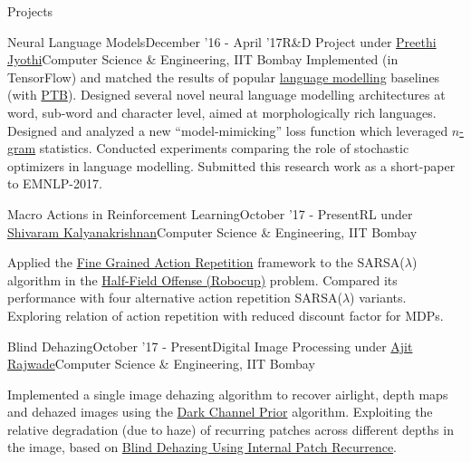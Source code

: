 \documentclass{resume} %
\begin{document}
\begin{rSection}{Projects}
\begin{rSubsection}{Neural Language Models}{December '16 - April '17}{R\&D Project under \href{https://www.cse.iitb.ac.in/~pjyothi/}{Preethi Jyothi}}{Computer Science \& Engineering, IIT Bombay}
Implemented (in TensorFlow) and matched the results of popular \href{https://en.wikipedia.org/wiki/Language_model}{language modelling} baselines (with \href{https://en.wikipedia.org/wiki/Treebank}{PTB}). Designed several novel neural language modelling architectures at word, sub-word and character level, aimed at morphologically rich languages. Designed and analyzed a new ``model-mimicking'' loss function which leveraged \href{https://en.wikipedia.org/wiki/N-gram}{$n$-gram} statistics. Conducted experiments comparing the role of stochastic optimizers in language modelling. Submitted this research work as a short-paper to EMNLP-2017.
\end{rSubsection}
\begin{rSubsection}{Macro Actions in Reinforcement Learning}{October '17 - Present}{RL under \href{https://www.cse.iitb.ac.in/~shivaram/}{Shivaram Kalyanakrishnan}}{Computer Science \& Engineering, IIT Bombay}
\item Applied the \href{https://arxiv.org/pdf/1702.06054.pdf}{Fine Grained Action Repetition} framework to the SARSA($\lambda$) algorithm in the \href{https://github.com/LARG/HFO}{Half-Field Offense (Robocup)} problem. Compared its performance with four alternative action repetition SARSA($\lambda$) variants. Exploring relation of action repetition with reduced discount factor for MDPs.
\end{rSubsection}
\begin{rSubsection}{Blind Dehazing}{October '17 - Present}{Digital Image Processing under \href{https://www.cse.iitb.ac.in/~ajitvr/}{Ajit Rajwade}}{Computer Science \& Engineering, IIT Bombay}
\item Implemented a single image dehazing algorithm to recover airlight, depth maps and dehazed images using the \href{https://www.robots.ox.ac.uk/~vgg/rg/papers/hazeremoval.pdf}{Dark Channel Prior} algorithm. Exploiting the relative degradation (due to haze) of recurring patches across different depths in the image, based on \href{http://www.wisdom.weizmann.ac.il/~ybahat/papers/blindDehazing_ICCP2016.pdf}{Blind Dehazing Using Internal Patch Recurrence}.
\end{rSubsection}

\end{rSection}
\end{document}
